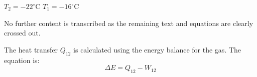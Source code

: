 \( T_2 = -22^\circ\text{C} \)  
\( T_1 = -16^\circ\text{C} \)  

No further content is transcribed as the remaining text and equations are clearly crossed out.

The heat transfer \( Q_{12} \) is calculated using the energy balance for the gas.  
The equation is:  
\[
\Delta E = Q_{12} - W_{12}
\]